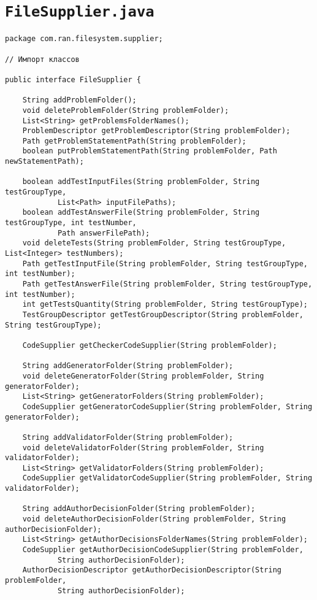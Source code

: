 \section*{\texttt{FileSupplier.java}}
\begin{verbatim}
package com.ran.filesystem.supplier;

// Импорт классов

public interface FileSupplier {

    String addProblemFolder();
    void deleteProblemFolder(String problemFolder);
    List<String> getProblemsFolderNames();
    ProblemDescriptor getProblemDescriptor(String problemFolder);
    Path getProblemStatementPath(String problemFolder);
    boolean putProblemStatementPath(String problemFolder, Path newStatementPath);
    
    boolean addTestInputFiles(String problemFolder, String testGroupType,
            List<Path> inputFilePaths);
    boolean addTestAnswerFile(String problemFolder, String testGroupType, int testNumber,
            Path answerFilePath);
    void deleteTests(String problemFolder, String testGroupType, List<Integer> testNumbers);
    Path getTestInputFile(String problemFolder, String testGroupType, int testNumber);
    Path getTestAnswerFile(String problemFolder, String testGroupType, int testNumber);
    int getTestsQuantity(String problemFolder, String testGroupType);
    TestGroupDescriptor getTestGroupDescriptor(String problemFolder, String testGroupType);
    
    CodeSupplier getCheckerCodeSupplier(String problemFolder);

    String addGeneratorFolder(String problemFolder);
    void deleteGeneratorFolder(String problemFolder, String generatorFolder);
    List<String> getGeneratorFolders(String problemFolder);
    CodeSupplier getGeneratorCodeSupplier(String problemFolder, String generatorFolder);
    
    String addValidatorFolder(String problemFolder);
    void deleteValidatorFolder(String problemFolder, String validatorFolder);
    List<String> getValidatorFolders(String problemFolder);
    CodeSupplier getValidatorCodeSupplier(String problemFolder, String validatorFolder);

    String addAuthorDecisionFolder(String problemFolder);
    void deleteAuthorDecisionFolder(String problemFolder, String authorDecisionFolder);
    List<String> getAuthorDecisionsFolderNames(String problemFolder);
    CodeSupplier getAuthorDecisionCodeSupplier(String problemFolder,
            String authorDecisionFolder);
    AuthorDecisionDescriptor getAuthorDecisionDescriptor(String problemFolder,
            String authorDecisionFolder);


\end{verbatim}
